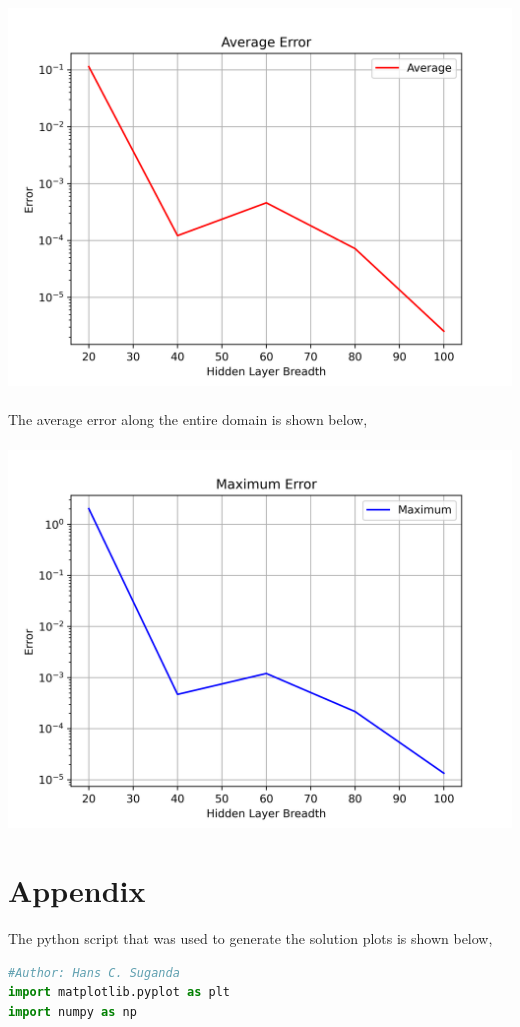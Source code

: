 \documentclass[a4paper, 12pt]{report}
\def\size{0.92}
\begin{document}
\begin{center}
\\~\\\includegraphics[scale=\size]{breadthMean.png}
\\~\\The average error along the entire domain is shown below,
\\~\\\includegraphics[scale=\size]{breadthMax.png}
\section{Appendix}

The python script that was used to generate the solution plots is shown below,
\begin{lstlisting}[language=python]
#Author: Hans C. Suganda
import matplotlib.pyplot as plt
import numpy as np


\end{lstlisting}
\end{center}
\end{document}
